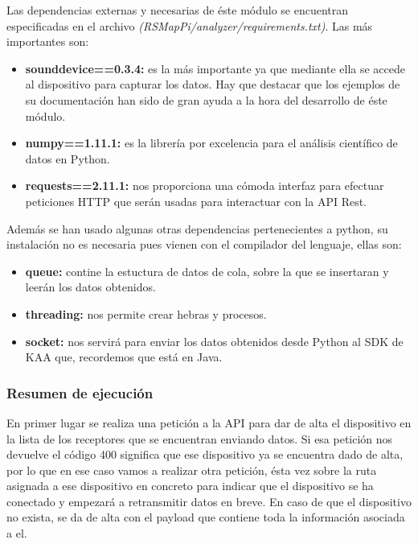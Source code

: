 Las dependencias externas y necesarias de éste módulo se encuentran especificadas en el archivo \textit{(RSMapPi/\/analyzer/\/requirements.txt)}. Las más importantes son:

\begin{itemize}
	\item \textbf{sounddevice==0.3.4:} es la más importante ya que mediante ella se accede al dispositivo para capturar los datos. Hay que destacar que los ejemplos de su documentación han sido de gran ayuda a la hora del desarrollo de éste módulo.
	\item \textbf{numpy==1.11.1:} es la librería por excelencia para el análisis científico de datos en Python.
	\item \textbf{requests==2.11.1:} nos proporciona una cómoda interfaz para efectuar peticiones HTTP que serán usadas para interactuar con la API Rest.
\end{itemize}

\newpage

Además se han usado algunas otras dependencias pertenecientes a python, su instalación no es necesaria pues vienen con el compilador del lenguaje, ellas son:

\begin{itemize}
	\item \textbf{queue:} contine la estuctura de datos de cola, sobre la que se insertaran y leerán los datos obtenidos.
	\item \textbf{threading:} nos permite crear hebras y procesos.
	\item \textbf{socket:} nos servirá para enviar los datos obtenidos desde Python al SDK de KAA que, recordemos que está en Java.
\end{itemize}

\bigskip

\subsubsection{Resumen de ejecución}

\bigskip

En primer lugar se realiza una petición a la API para dar de alta el dispositivo en la lista de los receptores que se encuentran enviando datos. Si esa petición nos devuelve el código 400 significa que ese dispositivo ya se encuentra dado de alta, por lo que en ese caso vamos a realizar otra petición, ésta vez sobre la ruta asignada a ese dispositivo en concreto para indicar que el dispositivo se ha conectado y empezará a retransmitir datos en breve. En caso de que el dispositivo no exista, se da de alta con el payload que contiene toda la información asociada a el.

